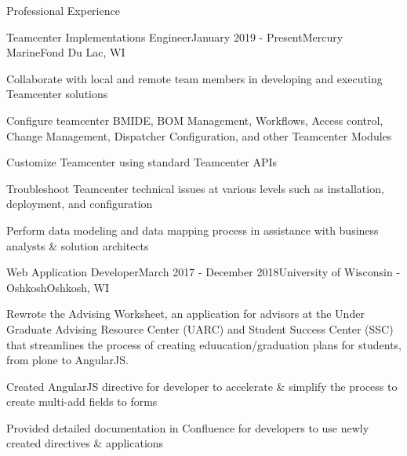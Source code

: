 \documentclass{resume} %
\begin{document}
\begin{rSection}{Professional Experience}

    \begin{rSubsection}{Teamcenter Implementations Engineer}{January 2019 - Present}{Mercury Marine}{Fond Du Lac, WI}
        \item Collaborate with local and remote team members in developing and executing Teamcenter solutions
        \item Configure teamcenter BMIDE, BOM Management, Workflows, Access control, Change Management, Dispatcher Configuration, and other Teamcenter Modules
        \item Customize Teamcenter using standard Teamcenter APIs
        \item Troubleshoot Teamcenter technical issues at various levels such as installation, deployment, and configuration
        \item Perform data modeling and data mapping process in assistance with business analysts \& solution architects
    \end{rSubsection}

    \begin{rSubsection}{Web Application Developer}{March 2017 - December 2018}{University of Wisconsin - Oshkosh}{Oshkosh, WI}
        \item Rewrote the Advising Worksheet, an application for advisors at the Under Graduate Advising Resource Center (UARC) and 
            Student Success Center (SSC) that streamlines the process of creating eduucation/graduation plans for students, from 
            plone to AngularJS. 
        \item Created AngularJS directive for developer to accelerate \& simplify the process to create multi-add fields to forms
        \item Provided detailed documentation in Confluence for developers to use newly created directives \& applications
    \end{rSubsection}


\end{rSection}
\end{document}
